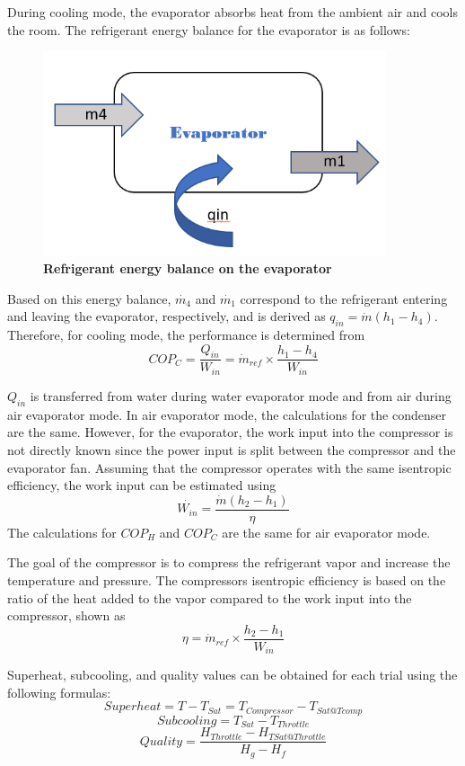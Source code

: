 \documentclass{article}
\begin{document}
During cooling mode, the evaporator absorbs heat from the ambient air and cools the room. The refrigerant energy balance for the evaporator is as follows: 
\begin{figure} [H]
	\centering
	\includegraphics[width=0.9\textwidth]{ebal_evap}
	\caption{\textbf{Refrigerant energy balance on the evaporator}}
\end{figure}
Based on this energy balance, $\dot{m_4}$ and $\dot{m_1}$ correspond to the refrigerant entering and leaving the evaporator, respectively, and is derived as $q_{in} = \dot{m} (h_1 - h_4) $. Therefore, for cooling mode, the performance is determined from $$ COP_C = \frac{Q_{in}}{W_{in}} = \dot{m}_{ref} \times \frac{h_1 - h_4}{W_{in}} $$ 

$Q_{in}$ is transferred from water during water evaporator mode and from air during air evaporator mode. In air evaporator mode, the calculations for the condenser are the same. However, for the evaporator, the work input into the compressor is not directly known since the power input is split between the compressor and the evaporator fan. Assuming that the compressor operates with the same isentropic efficiency, the work input can be estimated using 
$$ \dot{W_{in}} = \frac{\dot{m} (h_2 - h_1)} {\eta} $$ 
The calculations for $COP_H$ and $COP_C$ are the same for air evaporator mode. 

The goal of the compressor is to compress the refrigerant vapor and increase the temperature and pressure. The compressors isentropic efficiency is based on the ratio of the heat added to the vapor compared to the work input into the compressor, shown as $$ \eta =  \dot{m}_{ref} \times \frac{h_2 - h_1}{W_{in}} $$ 

Superheat, subcooling, and quality values can be obtained for each trial using the following formulas:
$$ Superheat = T - T_{Sat} = T_{Compressor} - T_{Sat @ Tcomp} $$
$$ Subcooling = T_{Sat} - T_{Throttle}  $$
$$ Quality = \frac{H_{Throttle}- H_{TSat @ Throttle}}{H_g - H_f} $$
\end{document}
